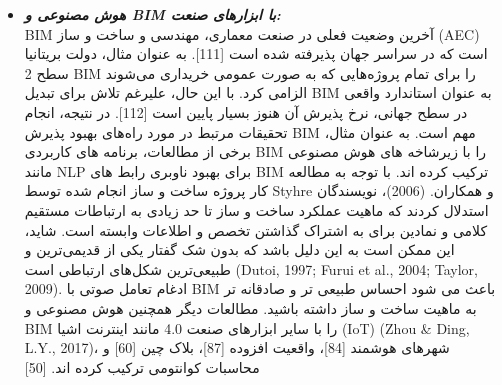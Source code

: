 \documentclass[towcolumn, 11pt]{Article}
\begin{document}
\begin{چکیده}
\begin{itemize}
\item
\textbf{\emph{هوش مصنوعی و BIM با ابزارهای صنعت:}}
\\BIM آخرین وضعیت فعلی در صنعت معماری، مهندسی و ساخت و ساز (AEC) است که در سراسر جهان پذیرفته شده است [111]. به عنوان مثال، دولت بریتانیا سطح 2 BIM را برای تمام پروژه‌هایی که به صورت عمومی خریداری می‌شوند الزامی کرد. با این حال، علیرغم تلاش برای تبدیل BIM به عنوان استاندارد واقعی در سطح جهانی، نرخ پذیرش آن هنوز بسیار پایین است [112]. در نتیجه، انجام تحقیقات مرتبط در مورد راه‌های بهبود پذیرش BIM مهم است. به عنوان مثال، برخی از مطالعات، برنامه های کاربردی BIM را با زیرشاخه های هوش مصنوعی مانند NLP برای بهبود ناوبری رابط های BIM ترکیب کرده اند. با توجه به مطالعه کار پروژه ساخت و ساز انجام شده توسط Styhre و همکاران. (2006)، نویسندگان استدلال کردند که ماهیت عملکرد ساخت و ساز تا حد زیادی به ارتباطات مستقیم کلامی و نمادین برای به اشتراک گذاشتن تخصص و اطلاعات وابسته است. شاید، این ممکن است به این دلیل باشد که بدون شک گفتار یکی از قدیمی‌ترین و طبیعی‌ترین شکل‌های ارتباطی است (Dutoi, 1997; Furui et al., 2004; Taylor, 2009). ادغام تعامل صوتی با BIM باعث می شود احساس طبیعی تر و صادقانه تر به ماهیت ساخت و ساز داشته باشید. مطالعات دیگر همچنین هوش مصنوعی و BIM را با سایر ابزارهای صنعت 4.0 مانند اینترنت اشیا (IoT) (Zhou & Ding, L.Y., 2017)، شهرهای هوشمند [84]، واقعیت افزوده [87]، بلاک چین [60] و محاسبات کوانتومی ترکیب کرده اند. [50]

\end{itemize}


\end{چکیده}
\end{document}
